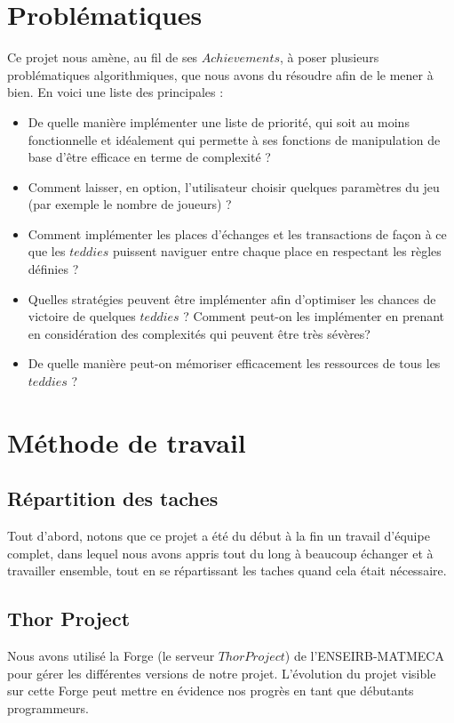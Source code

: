 \documentclass{article}
\begin{document}
 \section*{Problématiques} Ce projet nous amène, au fil de ses $Achievements$, à poser plusieurs problématiques algorithmiques, que nous avons du résoudre afin de le mener à bien. En voici une liste des principales :\\
 \begin{itemize}
     \item De quelle manière implémenter une liste de priorité, qui soit au moins fonctionnelle et idéalement qui permette à ses fonctions de manipulation de base d'être efficace en terme de complexité ?
     \item Comment laisser, en option, l'utilisateur choisir quelques paramètres du jeu (par exemple le nombre de joueurs) ?  
     \item Comment implémenter les places d'échanges et les transactions de façon à ce que les $teddies$ puissent naviguer entre chaque place en respectant les règles définies ?
     \item Quelles stratégies peuvent être implémenter afin d'optimiser les chances de victoire de quelques $teddies$ ? Comment peut-on les implémenter en prenant en considération des complexités qui peuvent être très sévères? 
     \item De quelle manière peut-on mémoriser efficacement les ressources de tous les $teddies$ ?
 \end{itemize}

\newpage
 


 \section{Méthode de travail}
    \subsection{Répartition des taches}
    Tout d'abord, notons que ce projet a été du début à la fin un travail d'équipe complet, dans lequel nous avons appris tout du long à beaucoup échanger et à travailler ensemble, tout en se répartissant les taches quand cela était nécessaire.
    \subsection{Thor Project}
    Nous avons utilisé la Forge (le serveur $Thor Project$) de l'ENSEIRB-MATMECA pour gérer les différentes versions de notre projet. L'évolution du projet visible sur cette Forge peut mettre en évidence nos progrès en tant que débutants programmeurs.
\end{document}
